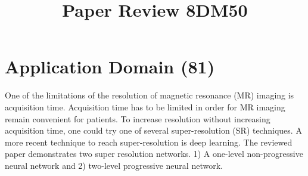 \documentclass[conference]{IEEEtran}
\begin{document}
\title{Paper Review 8DM50}

\author{
\and
{}
\and
{}
\and
{}
\and
{}
}

\maketitle




\section{Application Domain (81)}
One of the limitations of the resolution of magnetic resonance (MR) imaging is
acquisition time. Acquisition time has to be limited in order for MR imaging
remain convenient for patients. To increase resolution without increasing
acquisition time, one could try one of several super-resolution (SR) techniques.
A more recent technique to reach super-resolution is deep learning. The reviewed
paper demonstrates two super resolution networks. 1) A one-level non-progressive
neural network and 2) two-level progressive neural network.
\end{document}
